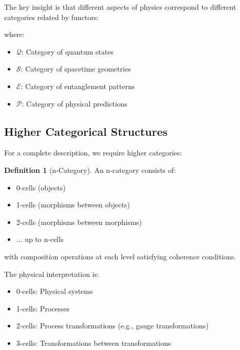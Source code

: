 \documentclass[12pt,a4paper]{article}
\newcommand{\cat}[1]{\mathcal{#1}}
\newcommand{\functor}{\mathcal{F}}
\theoremstyle{plain}
\theoremstyle{definition}
\newtheorem{definition}[theorem]{Definition}
\theoremstyle{remark}
\begin{document}
The key insight is that different aspects of physics correspond to different categories related by functors:

\begin{center}
\end{center}

where:
\begin{itemize}
\item $\cat{Q}$: Category of quantum states
\item $\cat{S}$: Category of spacetime geometries  
\item $\cat{E}$: Category of entanglement patterns
\item $\cat{P}$: Category of physical predictions
\end{itemize}

\subsection{Higher Categorical Structures}

For a complete description, we require higher categories:

\begin{definition}[n-Category]
An n-category consists of:
\begin{itemize}
\item 0-cells (objects)
\item 1-cells (morphisms between objects)
\item 2-cells (morphisms between morphisms)
\item ... up to n-cells
\end{itemize}
with composition operations at each level satisfying coherence conditions.
\end{definition}

The physical interpretation is:
\begin{itemize}
\item 0-cells: Physical systems
\item 1-cells: Processes
\item 2-cells: Process transformations (e.g., gauge transformations)
\item 3-cells: Transformations between transformations
\end{itemize}
\end{document}

